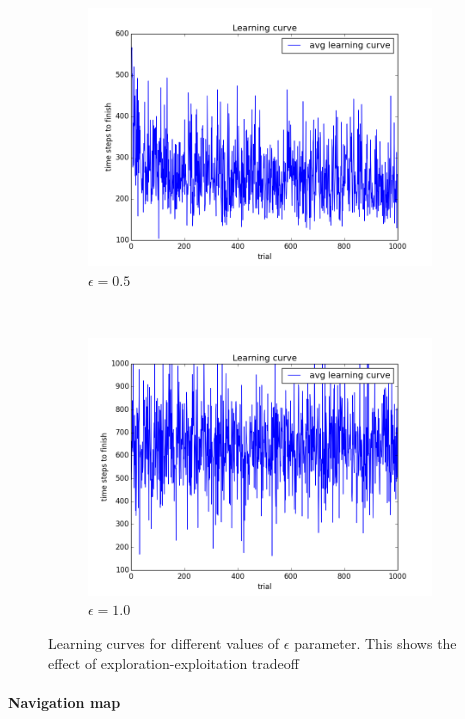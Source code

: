 \begin{figure}[h!]
\begin{subfigure}[b]{0.4\textwidth}
    \includegraphics[width=\textwidth]{figures/epsilon_5_learning_curve.png}
    \caption{\label{fig:eps5}$\epsilon = 0.5$}
\end{subfigure}
~
\begin{subfigure}[b]{0.4\textwidth}
    \includegraphics[width=\textwidth]{figures/epsilon_10_learning_curve.png}
    \caption{\label{fig:eps10}$\epsilon = 1.0$}
\end{subfigure}
\caption{\label{fig:eps}Learning curves for different values of $\epsilon$
parameter. This shows the effect of exploration-exploitation tradeoff}
\end{figure}
 


\newpage
\paragraph{Navigation map}

